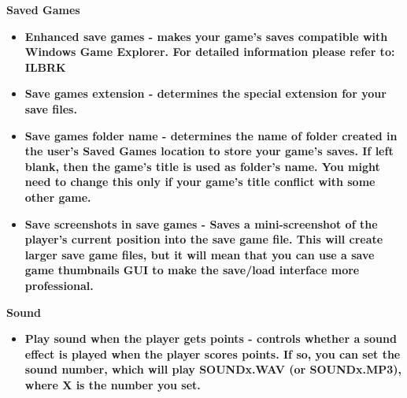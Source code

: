 \bf{Saved Games}
\begin{itemize}
\item \bf{Enhanced save games} - makes your game's saves compatible with  Windows Game Explorer.
For detailed information please refer to:  ILBRK
\item \bf{Save games extension} - determines the special extension for your save files.
\item \bf{Save games folder name} - determines the name of folder created in the user's Saved Games location to store your game's saves.
If left blank, then the game's title is used as folder's name. You might need to change this only if your game's title conflict with some other game.
\item \bf{Save screenshots in save games} - Saves a mini-screenshot of the player's current
position into the save game file. This will create larger save game files, but it will
mean that you can use a save game thumbnails GUI to make the save/load interface
more professional.
\end{itemize}

\bf{Sound}
\begin{itemize}
\item \bf{Play sound when the player gets points} - controls whether a sound effect is played when
the player scores points. If so, you can set the sound number, which will
play SOUNDx.WAV (or SOUNDx.MP3), where X is the number you set.
\end{itemize}

